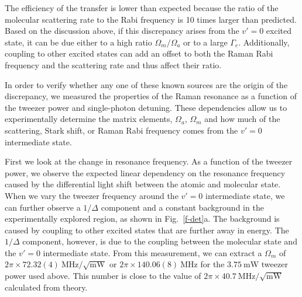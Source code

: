 \documentclass[aps,prl,twocolumn,10pt,superscriptaddress]{revtex4-1}
\newcommand{\todo}[1]{}
\begin{document}
The efficiency of the transfer is lower than expected
because the ratio of the molecular scattering rate to the Rabi frequency
is 10 times larger than predicted.
Based on the discussion above, if this discrepancy arises from the $v'=0$ excited state,
it can be due either to a high ratio $\Omega_m / \Omega_a$ or to a large $\Gamma_e$.
Additionally, coupling to other excited states can add an offset to
both the Raman Rabi frequency and the scattering rate and thus affect their ratio.

In order to verify whether any one of these known sources are the origin of the discrepancy,
we measured the properties of the Raman resonance as a function of the tweezer power and single-photon detuning.
These dependencies allow us to experimentally determine the matrix elements,
$ \Omega_a $, $\Omega_m $ and how much of the scattering, Stark shift,
or Raman Rabi frequency comes from the $ v' = 0$ intermediate state.

First we look at the change in resonance frequency.
As a function of the tweezer power,
we observe the expected linear dependency on the resonance frequency
caused by the differential light shift between the atomic and molecular state.
When we vary the tweezer frequency around the $v'=0$ intermediate state,
we can further observe a $1/\Delta$ component
and a constant background in the experimentally explored region, as shown in Fig.~\ref{f-det}a.
The background is caused by coupling to other excited states that are further away in energy.
The $1/\Delta$ component, however, is due to the coupling between the molecular state
and the $v'=0$ intermediate state.
From this measurement, we can extract a $\Omega_m$ of
$2\pi\times72.32(4) ~\mathrm{MHz}/\sqrt{\mathrm{mW}}$ or
$2\pi\times140.06(8) ~\mathrm{MHz}$ for the $3.75~\mathrm{mW}$ tweezer power used above.
This number is close to the value of
$2\pi\times40.7 ~\mathrm{MHz}/\sqrt{\mathrm{mW}}$ calculated from theory. \todo{ref/sm theory}
\end{document}
